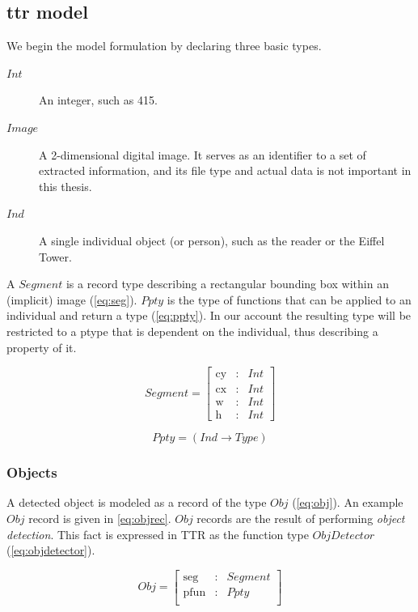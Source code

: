 \documentclass[11pt, a4paper]{article}
\begin{document}
\subsection{\Gls{ttr} model}

We begin the model formulation by declaring three basic types.

\begin{description}
\item [$Int$] An integer, such as 415.
\item [$Image$] A 2-dimensional digital image. It serves as an identifier to a set of extracted information, and its file type and actual data is not important in this thesis.
\item [$Ind$] A single individual object (or person), such as the reader or the Eiffel Tower.
\end{description}

A $Segment$ is a record type describing a rectangular bounding box within an (implicit) image (\autoref{eq:seg}).
$Ppty$ is the type of functions that can be applied to an individual and return a type (\autoref{eq:ppty}).
In our account the resulting type will be restricted to a ptype that is dependent on the individual, thus describing a property of it.

\begin{equation}\label{eq:seg}
Segment = \left[\begin{array}{rcl}
\text{cy} &:& Int\\
\text{cx} &:& Int\\
\text{w} &:& Int\\
\text{h} &:& Int
\end{array}\right]\end{equation}

\begin{equation}\label{eq:ppty}
Ppty = (Ind \rightarrow Type)\end{equation}

\subsubsection{Objects}

A detected object is modeled as a record of the type $Obj$ (\autoref{eq:obj}).
An example $Obj$ record is given in \autoref{eq:objrec}.
$Obj$ records are the result of performing \textit{object detection}.
This fact is expressed in TTR as the function type $ObjDetector$ (\autoref{eq:objdetector}).

\begin{equation}\label{eq:obj}
Obj = \left[\begin{array}{rcl}
\text{seg} &:& Segment\\
\text{pfun} &:& Ppty \\
\end{array}\right]\end{equation}
\end{document}
